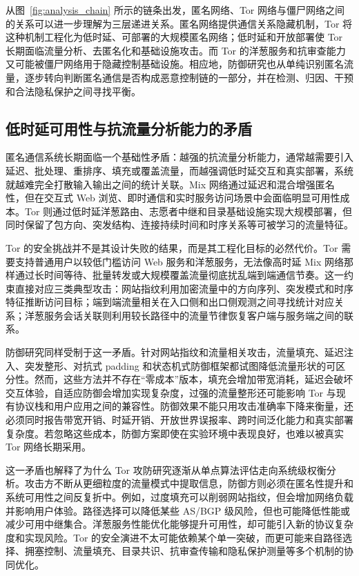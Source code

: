 从图~\ref{fig:analysis_chain} 所示的链条出发，匿名网络、Tor 网络与僵尸网络之间的关系可以进一步理解为三层递进关系。匿名网络提供通信关系隐藏机制，Tor 将这种机制工程化为低时延、可部署的大规模匿名网络；低时延和开放部署使 Tor 长期面临流量分析、去匿名化和基础设施攻击。而 Tor 的洋葱服务和抗审查能力又可能被僵尸网络用于隐藏控制基础设施。相应地，防御研究也从单纯识别匿名流量，逐步转向判断匿名通信是否构成恶意控制链的一部分，并在检测、归因、干预和合法隐私保护之间寻找平衡。

\subsection{低时延可用性与抗流量分析能力的矛盾}

匿名通信系统长期面临一个基础性矛盾：越强的抗流量分析能力，通常越需要引入延迟、批处理、重排序、填充或覆盖流量，而越强调低时延交互和真实部署，系统就越难完全打散输入输出之间的统计关联。Mix 网络通过延迟和混合增强匿名性，但在交互式 Web 浏览、即时通信和实时服务访问场景中会面临明显可用性成本。Tor 则通过低时延洋葱路由、志愿者中继和目录基础设施实现大规模部署，但同时保留了包方向、突发结构、连接持续时间和时序关系等可被学习的流量特征。

Tor 的安全挑战并不是其设计失败的结果，而是其工程化目标的必然代价。Tor 需要支持普通用户以较低门槛访问 Web 服务和洋葱服务，无法像高时延 Mix 网络那样通过长时间等待、批量转发或大规模覆盖流量彻底扰乱端到端通信节奏。这一约束直接对应三类典型攻击：网站指纹利用加密流量中的方向序列、突发模式和时序特征推断访问目标；端到端流量相关在入口侧和出口侧观测之间寻找统计对应关系；洋葱服务会话关联则利用较长路径中的流量节律恢复客户端与服务端之间的联系。

防御研究同样受制于这一矛盾。针对网站指纹和流量相关攻击，流量填充、延迟注入、突发整形、对抗式 padding 和状态机式防御框架都试图降低流量形状的可区分性。然而，这些方法并不存在“零成本”版本，填充会增加带宽消耗，延迟会破坏交互体验，自适应防御会增加实现复杂度，过强的流量整形还可能影响 Tor 与现有协议栈和用户应用之间的兼容性。防御效果不能只用攻击准确率下降来衡量，还必须同时报告带宽开销、时延开销、开放世界误报率、跨时间泛化能力和真实部署复杂度。若忽略这些成本，防御方案即使在实验环境中表现良好，也难以被真实 Tor 网络长期采用。

这一矛盾也解释了为什么 Tor 攻防研究逐渐从单点算法评估走向系统级权衡分析。攻击方不断从更细粒度的流量模式中提取信息，防御方则必须在匿名性提升和系统可用性之间反复折中。例如，过度填充可以削弱网站指纹，但会增加网络负载并影响用户体验。路径选择可以降低某些 AS/BGP 级风险，但也可能降低性能或减少可用中继集合。洋葱服务性能优化能够提升可用性，却可能引入新的协议复杂度和实现风险。Tor 的安全演进不太可能依赖某个单一突破，而更可能来自路径选择、拥塞控制、流量填充、目录共识、抗审查传输和隐私保护测量等多个机制的协同优化。


